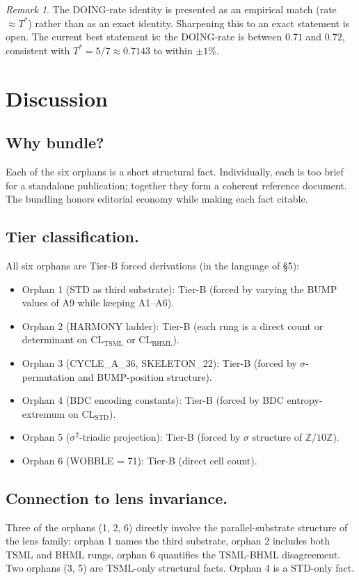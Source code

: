 \documentclass[11pt,reqno]{amsart}
\theoremstyle{plain}
\theoremstyle{definition}
\theoremstyle{remark}
\newtheorem*{remark}{Remark}
\newcommand{\Z}{\mathbb{Z}}
\newcommand{\TSML}{\mathrm{TSML}}
\newcommand{\BHML}{\mathrm{BHML}}
\newcommand{\STD}{\mathrm{STD}}
\begin{document}
\begin{remark}
The DOING-rate identity is presented as an empirical match (rate
$\approx T^*$) rather than as an exact identity. Sharpening this to
an exact statement is open. The current best statement is:
the DOING-rate is between $0.71$ and $0.72$, consistent with $T^* = 5/7
\approx 0.7143$ to within $\pm 1\%$.
\end{remark}

\section{Discussion}
\label{sec:discussion}

\subsection{Why bundle?}
Each of the six orphans is a short structural fact. Individually,
each is too brief for a standalone publication; together they form a
coherent reference document. The bundling honors editorial economy
while making each fact citable.

\subsection{Tier classification.}
All six orphans are Tier-B forced derivations (in the language of
\cite{SandersForcing} \S 5):
\begin{itemize}
\item Orphan 1 ($\STD$ as third substrate): Tier-B (forced by varying
the BUMP values of A9 while keeping A1--A6).
\item Orphan 2 (HARMONY ladder): Tier-B (each rung is a direct count
or determinant on $\mathrm{CL}_\TSML$ or $\mathrm{CL}_\BHML$).
\item Orphan 3 (CYCLE\_A\_36, SKELETON\_22): Tier-B (forced by
$\sigma$-permutation and BUMP-position structure).
\item Orphan 4 (BDC encoding constants): Tier-B (forced by
BDC entropy-extremum on $\mathrm{CL}_\STD$).
\item Orphan 5 ($\sigma^2$-triadic projection): Tier-B (forced by
$\sigma$ structure of $\Z/10\Z$).
\item Orphan 6 (WOBBLE = 71): Tier-B (direct cell count).
\end{itemize}

\subsection{Connection to lens invariance.}
Three of the orphans (1, 2, 6) directly involve the parallel-substrate
structure of the lens family: orphan 1 names the third substrate,
orphan 2 includes both TSML and BHML rungs, orphan 6 quantifies the
TSML-BHML disagreement. Two orphans (3, 5) are TSML-only structural
facts. Orphan 4 is a $\STD$-only fact.
\end{document}
